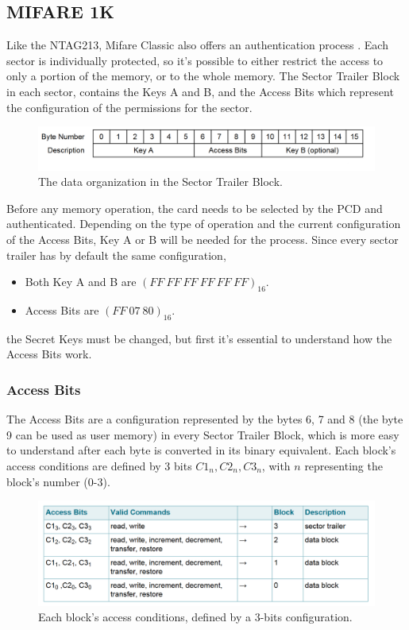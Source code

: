 \documentclass[target=bach,aauheader=,style=]{thud}
\begin{document}
\thinspace

\subsection{MIFARE 1K}
Like the NTAG213, Mifare Classic also offers an authentication process \cite{mifare1k}. Each sector is individually protected, so it's possible to either restrict the access to only a portion of the memory, or to the whole memory.
The Sector Trailer Block in each sector, contains the Keys A and B, and the Access Bits which represent the configuration of the permissions for the sector.

\begin{figure}[h!]
	\centering
	\includegraphics[scale=0.6]{sectortrailerblock} %
	\caption{The data organization in the Sector Trailer Block.}
	\label{fig:sectortrailerblock}
\end{figure}
\newpage

Before any memory operation, the card needs to be selected by the PCD and authenticated. Depending on the type of operation and the current configuration of the Access Bits, Key A or B will be needed for the process.
Since every sector trailer has by default the same configuration, 
\begin{itemize}
	\item Both Key A and B are $(FF\ FF\ FF\ FF\ FF\ FF)_{16}$.
	\item Access Bits are $(FF\ 07\ 80)_{16}$.
\end{itemize}
the Secret Keys must be changed, but first it's essential to understand how the Access Bits work.
\thinspace

\subsubsection{Access Bits}
The Access Bits are a configuration represented by the bytes 6, 7 and 8 (the byte 9 can be used as user memory) in every Sector Trailer Block, which is more easy to understand after each byte is converted in its binary equivalent. Each block's access conditions are defined by 3 bits $C1_n, C2_n, C3_n$, with $n$ representing the block's number (0-3).
\begin{figure}[h!]
	\centering
	\includegraphics[scale=0.65]{accessconditions} %
	\caption{Each block's access conditions, defined by a 3-bits configuration.}
	\label{fig:accessconditions}
\end{figure}
\end{document}
